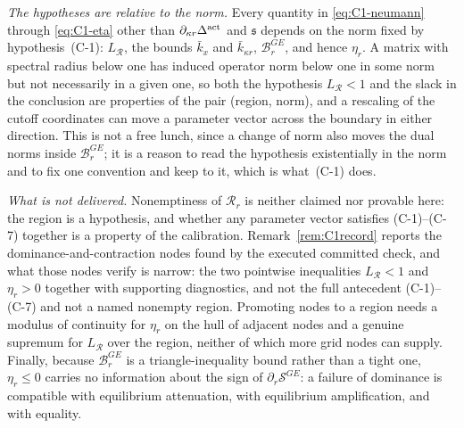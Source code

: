 \emph{The hypotheses are relative to the norm.} Every quantity in \eqref{eq:C1-neumann} through
\eqref{eq:C1-eta} other than $\partial_{\kappa r}\Delta^{\mathrm{act}}$ and $\mathfrak s$ depends on the norm fixed
by hypothesis~(C-1): $L_{\mathcal R}$, the bounds $\bar k_x$ and $\bar k_{\kappa r}$,
$\mathcal B_r^{GE}$, and hence $\eta_r$. A matrix with spectral radius below one has induced
operator norm below one in some norm but not necessarily in a given one, so both the hypothesis
$L_{\mathcal R} < 1$ and the slack in the conclusion are properties of the pair (region, norm), and
a rescaling of the cutoff coordinates can move a parameter vector across the boundary in either
direction. This is not a free lunch, since a change of norm also moves the dual norms inside
$\mathcal B_r^{GE}$; it is a reason to read the hypothesis existentially in the norm and to fix one
convention and keep to it, which is what~(C-1) does.

\emph{What is not delivered.} Nonemptiness of $\mathcal R_r$ is neither claimed nor provable here:
the region is a hypothesis, and whether any parameter vector satisfies (C-1)--(C-7) together is a
property of the calibration. Remark~\ref{rem:C1record} reports the dominance-and-contraction nodes
found by the executed committed check, and what those nodes verify is narrow: the two pointwise
inequalities $L_{\mathcal R} < 1$ and $\eta_r > 0$ together with supporting diagnostics, and not the
full antecedent (C-1)--(C-7) and not a named nonempty region. Promoting nodes to a region needs a
modulus of continuity for $\eta_r$ on the hull of adjacent nodes and a genuine supremum for
$L_{\mathcal R}$ over the region, neither of which more grid nodes can supply. Finally, because
$\mathcal B_r^{GE}$ is a triangle-inequality bound rather than a tight one, $\eta_r \le 0$ carries
no information about the sign of $\partial_r\mathcal S^{GE}$: a failure of dominance is compatible
with equilibrium attenuation, with equilibrium amplification, and with equality.
